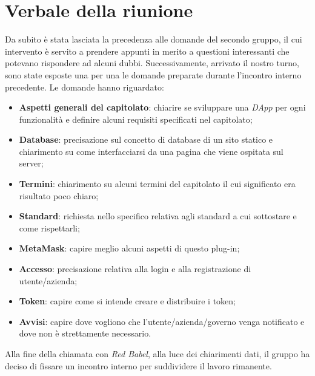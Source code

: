 \section{Verbale della riunione}
Da subito è stata lasciata la precedenza alle domande del secondo gruppo,
il cui intervento è servito a prendere appunti in merito a questioni interessanti
che potevano rispondere ad alcuni dubbi. Successivamente, arrivato il nostro turno,
sono state esposte una per una le domande preparate durante l'incontro interno 
precedente.\newline
Le domande hanno riguardato:

\begin{itemize}
	\item \textbf{Aspetti generali del capitolato}: chiarire se sviluppare una 
			\textit{DApp} per ogni funzionalità e definire alcuni requisiti specificati
			 nel capitolato;
	\item \textbf{Database}: precisazione sul concetto di database di un sito statico
			 e chiarimento su come interfacciarsi da una pagina che viene ospitata sul server;
	\item \textbf{Termini}: chiarimento su alcuni termini del capitolato il cui significato
			 era risultato poco chiaro;
	\item \textbf{Standard}: richiesta nello specifico relativa agli standard a cui sottostare
			 e come rispettarli;
	\item \textbf{MetaMask}: capire meglio alcuni aspetti di questo plug-in;
	\item \textbf{Accesso}: precisazione relativa alla login e alla registrazione di 
			 utente/azienda;
	\item \textbf{Token\glo{}}: capire come si intende creare e distribuire i token;
	\item \textbf{Avvisi}: capire dove vogliono che l'utente/azienda/governo venga 
			 notificato e dove non è strettamente necessario.
\end{itemize}
Alla fine della chiamata con \textit{Red Babel}, alla luce dei chiarimenti dati,
il gruppo ha deciso di fissare un incontro interno per suddividere il lavoro rimanente.
\pagebreak

